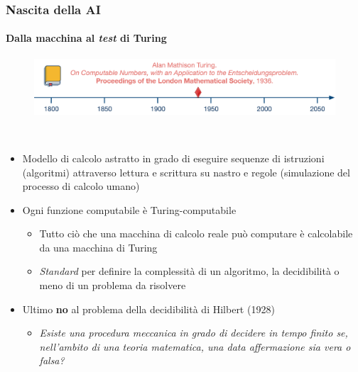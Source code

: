 %
\begin{frame}[t] \frametitle{Nascita della AI}
	{\scriptsize
		\onslide<1->
            \framesubtitle{Dalla macchina al \textit{test} di Turing}
            \vspace*{-.5cm}
            \begin{minipage}[t]{\textwidth}
             	\begin{figure}[ht]
                    \centering
                    \includegraphics[width=\textwidth]{img/AI-timeline-1936-alt.png}
                \end{figure}
            \end{minipage}
            \\\vspace*{.3cm}
	    	\begin{minipage}[t]{\textwidth}
				\begin{minipage}[t]{0.6\textwidth}
	    			\begin{itemize}[leftmargin=10pt,align=right]
						\onslide<2->\item[\alert{\faHandORight}] Modello di calcolo astratto in grado di eseguire sequenze di istruzioni (\alert{algoritmi}) attraverso lettura e scrittura su nastro e regole (simulazione del processo di calcolo umano)
						\onslide<3->\item[\alert{\faHandORight}] Ogni funzione computabile è Turing-computabile
                    	\onslide<4->\begin{itemize}[leftmargin=10pt,align=right]
							\item[\alert{\faHandORight}] Tutto ciò che una macchina di calcolo reale può computare è calcolabile da una macchina di Turing
							\item[\alert{\faHandORight}] \textit{Standard} per definire la complessità di un algoritmo, la decidibilità o meno di un problema da risolvere
						\end{itemize}
                    	\item[\alert{\faHandORight}] Ultimo \alert{\textbf{no}} al \alert{problema della decidibilità} di Hilbert (1928)
						\begin{itemize}[leftmargin=10pt,align=right]
							\item[\alert{\faHandORight}] \textit{Esiste una procedura meccanica in grado di decidere in tempo finito se, nell'ambito di una teoria matematica, una data affermazione sia vera o falsa?}

\end{itemize}
\end{itemize}
\end{minipage}
\end{minipage}}
\end{frame}
